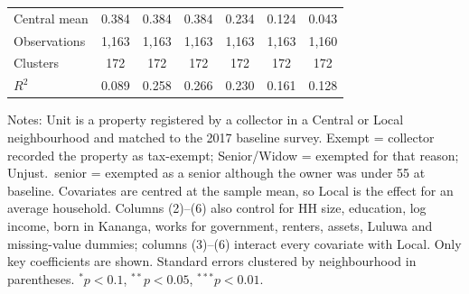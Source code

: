\begin{table}[!htbp]
\begin{tabular}{lcccccc}
Central mean & 0.384 & 0.384 & 0.384 & 0.234 & 0.124 & 0.043 \\
Observations & 1,163 & 1,163 & 1,163 & 1,163 & 1,163 & 1,160 \\
Clusters & 172 & 172 & 172 & 172 & 172 & 172 \\
$R^2$ & 0.089 & 0.258 & 0.266 & 0.230 & 0.161 & 0.128 \\
\hline\hline
\end{tabular}
\begin{minipage}{0.97\linewidth}\vspace{3pt}\scriptsize Notes: Unit is a property registered by a collector in a Central or Local neighbourhood and matched to the 2017 baseline survey. Exempt = collector recorded the property as tax-exempt; Senior/Widow = exempted for that reason; Unjust.\ senior = exempted as a senior although the owner was under 55 at baseline. Covariates are centred at the sample mean, so Local is the effect for an average household. Columns (2)--(6) also control for HH size, education, log income, born in Kananga, works for government, renters, assets, Luluwa and missing-value dummies; columns (3)--(6) interact every covariate with Local. Only key coefficients are shown. Standard errors clustered by neighbourhood in parentheses. $^{*}p<0.1$, $^{**}p<0.05$, $^{***}p<0.01$.\end{minipage}
\end{table}